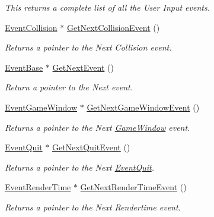 \begin{DoxyCompactItemize}
\begin{DoxyCompactList}\small\item\em This returns a complete list of all the User Input events. \item\end{DoxyCompactList}\item 
\hyperlink{classphys_1_1EventCollision}{EventCollision} $\ast$ \hyperlink{classphys_1_1EventManager_a8e8f88684cd9167ae59734cf14b64b76}{GetNextCollisionEvent} ()
\begin{DoxyCompactList}\small\item\em Returns a pointer to the Next Collision event. \item\end{DoxyCompactList}\item 
\hyperlink{classphys_1_1EventBase}{EventBase} $\ast$ \hyperlink{classphys_1_1EventManager_aa0937763961aefc59aea197a8f9bc0dc}{GetNextEvent} ()
\begin{DoxyCompactList}\small\item\em Return a pointer to the Next event. \item\end{DoxyCompactList}\item 
\hyperlink{classphys_1_1EventGameWindow}{EventGameWindow} $\ast$ \hyperlink{classphys_1_1EventManager_aead881349edba3f0bcca34eaae41a8ee}{GetNextGameWindowEvent} ()
\begin{DoxyCompactList}\small\item\em Returns a pointer to the Next \hyperlink{classphys_1_1GameWindow}{GameWindow} event. \item\end{DoxyCompactList}\item 
\hyperlink{classphys_1_1EventQuit}{EventQuit} $\ast$ \hyperlink{classphys_1_1EventManager_ad7da09e5422b1db79ac4187ee9198d0c}{GetNextQuitEvent} ()
\begin{DoxyCompactList}\small\item\em Returns a pointer to the Next \hyperlink{classphys_1_1EventQuit}{EventQuit}. \item\end{DoxyCompactList}\item 
\hyperlink{classphys_1_1EventRenderTime}{EventRenderTime} $\ast$ \hyperlink{classphys_1_1EventManager_ae8730b039a280449af052d75f2e60b06}{GetNextRenderTimeEvent} ()
\begin{DoxyCompactList}\small\item\em Returns a pointer to the Next Rendertime event. \item\end{DoxyCompactList}\item 

\end{DoxyCompactItemize}
